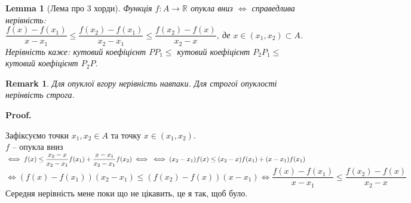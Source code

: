 \documentclass[a4paper, 14pt]{article}
\makeatletter
\def\qed{$\blacksquare$}
\theoremstyle{theoremdd}
\theoremstyle{theoremdd}
\theoremstyle{theoremdd}
\theoremstyle{theoremdd}
\theoremstyle{theoremdd}
\theoremstyle{theoremdd}
\newtheorem{remark}[theorem]{Remark}
\theoremstyle{theoremdd}
\newtheorem{lemma}[theorem]{Lemma}
\theoremstyle{theoremdd}
\renewenvironment{proof}[1][Proof.\\]{\par
\pushQED{\hfill \qed}%
\normalfont \topsep6\p@\@plus6\p@\relax
\trivlist
\item\relax
{\bfseries
#1\@addpunct{.}}\hspace\labelsep\ignorespaces
}{%
\popQED\endtrivlist\@endpefalse
}
\makeatother
\begin{document}
\begin{lemma}[Лема про 3 хорди]
Функція $f \colon A \to \mathbb{R}$ опукла вниз $\iff$ справедлива нерівність:\\
$\dfrac{f(x)-f(x_1)}{x-x_1} \leq \dfrac{f(x_2)-f(x_1)}{x_2-x_1} \leq \dfrac{f(x_2)-f(x)}{x_2-x}$, де $x \in (x_1,x_2) \subset A$.
\\ \iffalse %
\begin{figure}[H]
\centering
\begin{tikzpicture}
\draw[thick, ->] (-2,0)--(4,0) node[anchor = north] {$x$};
\draw[thick, ->] (0,-0.5)--(0,5) node[anchor = east] {$y$};

\draw[thick, domain=-1.5:4, variable=\x, samples = 1000] plot({\x}, {0.5*(\x-1)^2}) node at (3,4) {$f(x)$};
\node[black] at (-1,2) [circle,fill,inner sep=1pt, draw = black]{};
\node[black] at (3.5,3.125) [circle,fill,inner sep=1pt, draw = black]{};
\node[black] at (2,0.5) [circle,fill,inner sep=1pt, draw = black]{};

\node at (-1,2+0.5) {$P_1$};
\node at (3.5,3.125+0.5) {$P_2$};
\node at (2-0.1,0.5+0.4) {$P$};

\draw (-1,2)--(3.5,3.125);
\draw (-1,2)--(2,0.5);
\draw (2,0.5)--(3.5,3.125);
\draw[dashed] (-1,2)--(-1,0) node [anchor = north] {$x_1$};
\draw[dashed] (3.5,3.125)--(3.5,0) node [anchor = north] {$x_2$};
\draw[dashed] (2,0.5)--(2,0) node [anchor = north] {$x$};

\end{tikzpicture}
\end{figure}
\fi %
Нерівність каже: кутовий коефіцієнт $PP_1 \leq$ кутовий коефіцієнт $P_2P_1 \leq$ кутовий коефіцієнт $P_2P$.
\end{lemma}

\begin{remark}
Для опуклої вгору нерівність навпаки. Для строгої опуклості нерінвість строга.
\end{remark}

\begin{proof}
Зафіксуємо точки $x_1,x_2 \in A$ та точку $x \in (x_1,x_2)$.\\
$f$ -- опукла вниз $\iff f(x) \leq \dfrac{x_2-x}{x_2-x_1}f(x_1) + \dfrac{x-x_1}{x_2-x_1}f(x_2)
\iff \\ \iff (x_2-x_1) f(x) \leq (x_2-x)f(x_1) + (x-x_1)f(x_1)$\\
$\iff (f(x)-f(x_1))(x_2-x_1) \leq (f(x_2)-f(x))(x-x_1)
\iff \dfrac{f(x)-f(x_1)}{x-x_1} \leq \dfrac{f(x_2)-f(x)}{x_2-x}$ \\
Середня нерівність мене поки що не цікавить, це я так, щоб було.
\end{proof}
\end{document}
